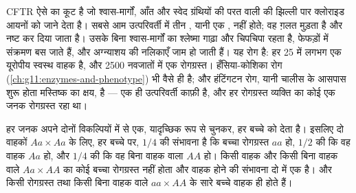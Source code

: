 \begin{example}[सिस्टिक फ़ाइब्रोसिस]\label{ex:g11:genes-and-disease:cf}
CFTR  ऐसे  का कूट है जो श्वास-मार्गों, आँत और स्वेद ग्रंथियों की
परत वाली  की झिल्ली पार क्लोराइड आयनों को जाने देता है। सबसे आम
उत्परिवर्ती  में तीन , यानी एक , नहीं होते;
वह  ग़लत मुड़ता है और नष्ट कर दिया जाता है। उसके बिना श्वास-मार्गों
का श्लेष्मा गाढ़ा और चिपचिपा रहता है, फेफड़ों में संक्रमण बस जाते हैं, और
अग्न्याशय की नलिकाएँ जाम हो जाती हैं। यह रोग  है: हर 25 में लगभग
एक यूरोपीय स्वस्थ वाहक है, और 2500 नवजातों में एक रोगग्रस्त।
हँसिया-कोशिका रोग (\cref{ch:g11:enzymes-and-phenotype}) भी वैसे ही
 है; और हंटिंगटन रोग, यानी चालीस के आसपास शुरू होता मस्तिष्क का
क्षय,  है --- एक ही उत्परिवर्ती  काफ़ी है, और हर रोगग्रस्त
व्यक्ति का कोई एक जनक रोगग्रस्त रहा था।
\end{example}

\begin{proposition}[अप्रभावी रोग का संचरण]\label{prop:g11:genes-and-disease:recessive}
हर जनक अपने दोनों विकल्पियों में से एक, यादृच्छिक रूप से चुनकर, हर बच्चे को
देता है। इसलिए दो वाहकों $Aa \times Aa$ के लिए, हर बच्चे पर, $1/4$ की
संभावना है कि बच्चा रोगग्रस्त $aa$ हो, $1/2$ की कि वह वाहक $Aa$ हो, और
$1/4$ की कि वह बिना वाहक वाला $AA$ हो। किसी वाहक और किसी बिना वाहक वाले
$Aa \times AA$ का कोई बच्चा रोगग्रस्त नहीं होता और वाहक होने की संभावना
दो में एक है। और किसी रोगग्रस्त तथा किसी बिना वाहक वाले $aa \times AA$ के
सारे बच्चे वाहक ही होते हैं।
\end{proposition}
\admitted

